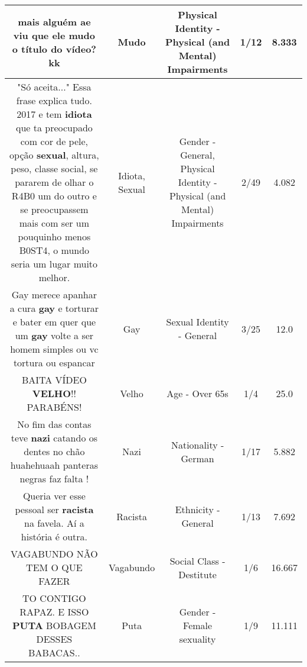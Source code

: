 \documentclass[11pt]{article}
\newlength\mylength
\begin{document}
\begin{center}
\begin{longtable}{|C{.65\mylength}|C{.30\mylength}|C{.12\mylength}|C{.12\mylength}|C{.12\mylength}|}
  \small mais alguém ae viu que ele \textbf{mudo} o título do vídeo? kk\normalsize   & Mudo & Physical Identity - Physical (and Mental) Impairments & 1/12 & 8.333 \\  \hline
  \small "Só aceita..." Essa frase explica tudo. 2017 e tem \textbf{idiota} que ta preocupado com cor de pele, opção \textbf{sexual}, altura, peso, classe social, se pararem de olhar o R4B0 um do outro e se preocupassem mais com ser um pouquinho menos B0ST4, o mundo seria um lugar muito melhor.\normalsize   & Idiota, Sexual & Gender - General, Physical Identity - Physical (and Mental) Impairments & 2/49 & 4.082 \\  \hline
  \small Gay merece apanhar a cura \textbf{gay} e torturar e bater em quer que um \textbf{gay} volte a ser homem simples ou vc tortura ou espancar\normalsize   & Gay & Sexual Identity - General & 3/25 & 12.0 \\  \hline
  \small BAITA VÍDEO \textbf{VELHO}!! PARABÉNS!\normalsize   & Velho & Age - Over 65s & 1/4 & 25.0 \\  \hline
  \small No fim das contas teve \textbf{nazi} catando os dentes no chão huahehuaah  panteras negras faz falta !\normalsize   & Nazi & Nationality - German & 1/17 & 5.882 \\  \hline
  \small Queria ver esse pessoal ser \textbf{racista} na favela. Aí a história é outra.\normalsize   & Racista & Ethnicity - General & 1/13 & 7.692 \\  \hline
  \small VAGABUNDO NÃO TEM O QUE FAZER\normalsize   & Vagabundo & Social Class - Destitute & 1/6 & 16.667 \\  \hline
  \small TO CONTIGO RAPAZ. E ISSO \textbf{PUTA} BOBAGEM DESSES BABACAS..\normalsize   & Puta & Gender - Female sexuality & 1/9 & 11.111 \\  \hline

\end{longtable}
\end{center}
\end{document}
